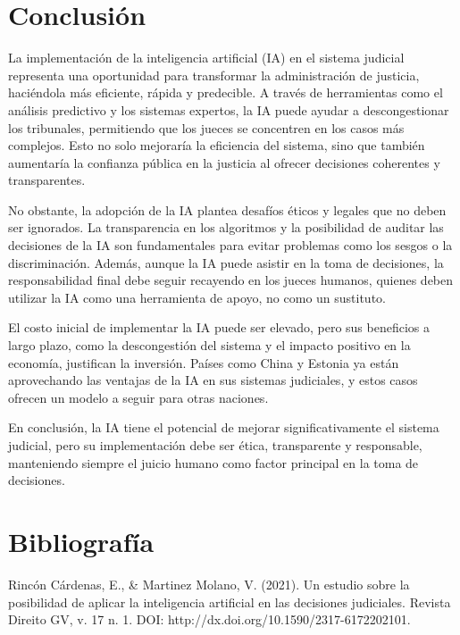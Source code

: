 \documentclass[runningheads]{llncs}
\begin{document}
\section{Conclusión}
La implementación de la inteligencia artificial (IA) en el sistema judicial representa una oportunidad para transformar la administración de justicia, haciéndola más eficiente, rápida y predecible. A través de herramientas como el análisis predictivo y los sistemas expertos, la IA puede ayudar a descongestionar los tribunales, permitiendo que los jueces se concentren en los casos más complejos. Esto no solo mejoraría la eficiencia del sistema, sino que también aumentaría la confianza pública en la justicia al ofrecer decisiones coherentes y transparentes.

No obstante, la adopción de la IA plantea desafíos éticos y legales que no deben ser ignorados. La transparencia en los algoritmos y la posibilidad de auditar las decisiones de la IA son fundamentales para evitar problemas como los sesgos o la discriminación. Además, aunque la IA puede asistir en la toma de decisiones, la responsabilidad final debe seguir recayendo en los jueces humanos, quienes deben utilizar la IA como una herramienta de apoyo, no como un sustituto.

El costo inicial de implementar la IA puede ser elevado, pero sus beneficios a largo plazo, como la descongestión del sistema y el impacto positivo en la economía, justifican la inversión. Países como China y Estonia ya están aprovechando las ventajas de la IA en sus sistemas judiciales, y estos casos ofrecen un modelo a seguir para otras naciones.

En conclusión, la IA tiene el potencial de mejorar significativamente el sistema judicial, pero su implementación debe ser ética, transparente y responsable, manteniendo siempre el juicio humano como factor principal en la toma de decisiones.

% 
% 
\section{Bibliografía}
Rincón Cárdenas, E.,  \& Martinez Molano, V. (2021). Un estudio sobre la posibilidad de aplicar la inteligencia artificial en las decisiones judiciales. Revista Direito GV, v. 17 n. 1. DOI: http://dx.doi.org/10.1590/2317-6172202101.
\end{document}
